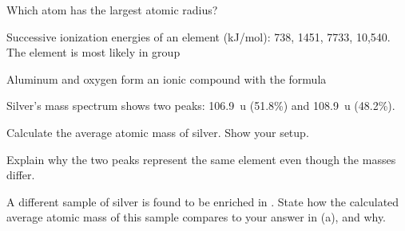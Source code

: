 \documentclass{apchem-exam}
\begin{document}
\begin{mcq}
  Which atom has the largest atomic radius?
  \choices
\end{mcq}

\begin{mcq}
  Successive ionization energies of an element (kJ/mol): 738, 1451, 7733,
  10{,}540. The element is most likely in group
  \choices
\end{mcq}

\begin{mcq}
  Aluminum and oxygen form an ionic compound with the formula
  \choices
\end{mcq}



Silver's mass spectrum shows two peaks: \SI{106.9}{u} (51.8\%) and
\SI{108.9}{u} (48.2\%).

\begin{parts}
  \item Calculate the average atomic mass of silver. Show your setup.
        \workspace[2.8cm]
  \item Explain why the two peaks represent the same element even though the
        masses differ. 
  \item A different sample of silver is found to be enriched in
        . State how the calculated average atomic mass of this
        sample compares to your answer in (a), and why.
\end{parts}
\end{document}

